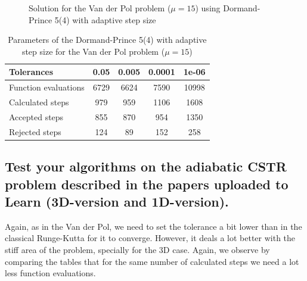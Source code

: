 \begin{figure}[H]
    \centering
    \caption{Solution for the Van der Pol problem ($\mathit{\mu = 15}$) using Dormand-Prince 5(4) with adaptive step size}
    \label{7_4_mu_15}
\end{figure}

\begin{table}[H]
    \centering
    \begin{tabular}{@{}l|cccc@{}}
    \toprule
    Tolerances           & 0.05 & 0.005 & 0.0001 & 1e-06 \\ \midrule
    Function evaluations & 6729 & 6624  & 7590   & 10998 \\
    Calculated steps     & 979  & 959   & 1106   & 1608  \\
    Accepted steps       & 855  & 870   & 954    & 1350  \\
    Rejected steps       & 124  & 89    & 152    & 258   \\ \bottomrule
    \end{tabular}
    \caption{Parameters of the Dormand-Prince 5(4) with adaptive step size for the Van der Pol problem ($\mathit{\mu = 15}$)}
    \label{7_4_adaptive_mu_15_table}
\end{table}

\subsection{Test  your  algorithms  on  the  adiabatic  CSTR  problem  described  in  the papers uploaded to Learn (3D-version and 1D-version).}
Again, as in the Van der Pol, we need to set the tolerance a bit lower than in the classical Runge-Kutta for it to converge. However, it deals a lot better with the stiff area of the problem, specially for the 3D case. Again, we observe by comparing the tables that for the same number of calculated steps we need a lot less function evaluations.

